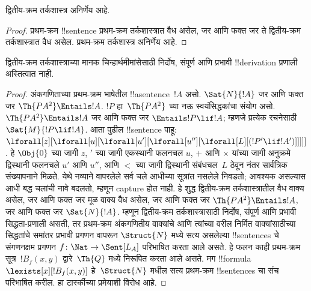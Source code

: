 \documentclass[../../../include/open-logic-section]{subfiles}
\begin{document}



\begin{thm}
द्वितीय-क्रम तर्कशास्त्र अनिर्णेय आहे.
\end{thm}

\begin{proof}
प्रथम-क्रम !!{sentence} प्रथम-क्रम तर्कशास्त्रात वैध असेल,
जर आणि फक्त जर ते द्वितीय-क्रम तर्कशास्त्रात वैध असेल.
प्रथम-क्रम तर्कशास्त्र अनिर्णेय आहे.
\end{proof}

\begin{thm}
द्वितीय-क्रम तर्कशास्त्राच्या मानक चिन्हार्थमीमांसेसाठी
निर्दोष, संपूर्ण आणि प्रभावी !!{derivation} प्रणाली अस्तित्वात नाही.
\end{thm}

\begin{proof}
अंकगणिताच्या प्रथम-क्रम भाषेतील !!a{sentence}~$!A$ असो.
$\Sat{N}{!A}$ जर आणि फक्त जर $\Th{PA^2} \Entails !A$.
$!P$ हा~$\Th{PA^2}$ च्या नऊ स्वयंसिद्धकांचा संयोग असो.
$\Th{PA^2} \Entails !A$ जर आणि फक्त जर
$\Entails !P \lif !A$; म्हणजे प्रत्येक रचनेसाठी
$\Sat{M}{!P \lif !A}$. आता पुढील !!{sentence} पाहू:
$\lforall[z][\lforall[u][\lforall[u'][\lforall[u''][\lforall[L][(!P' \lif !A')]]]]]$.
हे $\Obj{0}$ च्या जागी $z$, $\prime$ च्या जागी
एकस्थानी फलनचल $u$, $+$ आणि $\times$ यांच्या जागी
अनुक्रमे द्विस्थानी फलनचले $u'$ आणि $u''$,
आणि $<$ च्या जागी द्विस्थानी संबंधचल~$L$ ठेवून
नंतर सार्वत्रिक संख्यापनाने मिळते. येथे नव्याने वापरलेले
सर्व चले आधीच्या सूत्रांत नसलेले निवडतो; आवश्यक असल्यास
आधी बद्ध चलांची नावे बदलतो, म्हणून capture होत नाही. हे शुद्ध द्वितीय-क्रम
तर्कशास्त्रातील वैध वाक्य असेल, जर आणि फक्त जर मूळ
वाक्य वैध असेल, जर आणि फक्त जर
$\Th{PA^2} \Entails !A$, जर आणि फक्त जर
$\Sat{N}{!A}$. म्हणून द्वितीय-क्रम तर्कशास्त्रासाठी
निर्दोष, संपूर्ण आणि प्रभावी सिद्धता-प्रणाली असती, तर
प्रथम-क्रम अंकगणितीय वाक्यांचे आणि त्यांच्या वरील निर्मित
वाक्यांसाठीच्या सिद्धतांचे समांतर प्रभावी प्रगणन वापरून
$\Struct{N}$ मध्ये सत्य असलेल्या !!{sentence}s चे
संगणनक्षम प्रगणन $f\colon \Nat \to \Sent[L_A]$
परिभाषित करता आले असते. हे फलन काही प्रथम-क्रम
सूत्र~$!B_f(x, y)$ द्वारे~$\Th{Q}$ मध्ये निरूपित
करता आले असते. मग !!{formula}~$\lexists[x][!B_f(x, y)]$
हे~$\Struct{N}$ मधील सत्य प्रथम-क्रम !!{sentence}s चा संच
परिभाषित करील. हा टार्स्कीच्या प्रमेयाशी विरोध आहे.
\end{proof}
\end{document}
